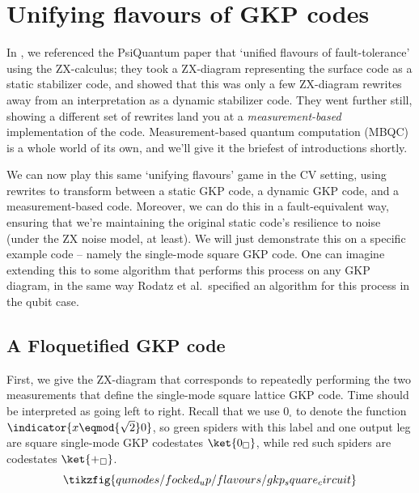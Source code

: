 \section{Unifying flavours of GKP codes}

In , we referenced the PsiQuantum paper  that `unified flavours of fault-tolerance' using the ZX-calculus; they took a ZX-diagram representing the surface code as a static stabilizer code, and showed that this was only a few ZX-diagram rewrites away from an interpretation as a dynamic stabilizer code.
They went further still, showing a different set of rewrites land you at a \textit{measurement-based} implementation of the code.
Measurement-based quantum computation (MBQC) is a whole world of its own, and we'll give it the briefest of introductions shortly.

We can now play this same `unifying flavours' game in the CV setting, using rewrites to transform between a static GKP code, a dynamic GKP code, and a measurement-based code.
Moreover, we can do this in a fault-equivalent way, ensuring that we're maintaining the original static code's resilience to noise (under the ZX noise model, at least).
We will just demonstrate this on a specific example code -- namely the single-mode square GKP code.
One can imagine extending this to some algorithm that performs this process on any GKP diagram, in the same way Rodatz et al.\ specified an algorithm for this process in the qubit case.

\subsection{A Floquetified GKP code}

First, we give the ZX-diagram that corresponds to repeatedly performing the two measurements that define the single-mode square lattice GKP code.
Time should be interpreted as going left to right.
Recall that we use $0_\square$ to denote the function $\indicator{x \eqmod{\sqrt{2}} 0}$, so green spiders with this label and one output leg are square single-mode GKP codestates $\ket{0_\square}$, while red such spiders are codestates $\ket{+_\square}$.
\begin{equation}\label{eq:gkp_square_circuit}
    \tikzfig{qumodes/focked_up/flavours/gkp_square_circuit}
\end{equation}


